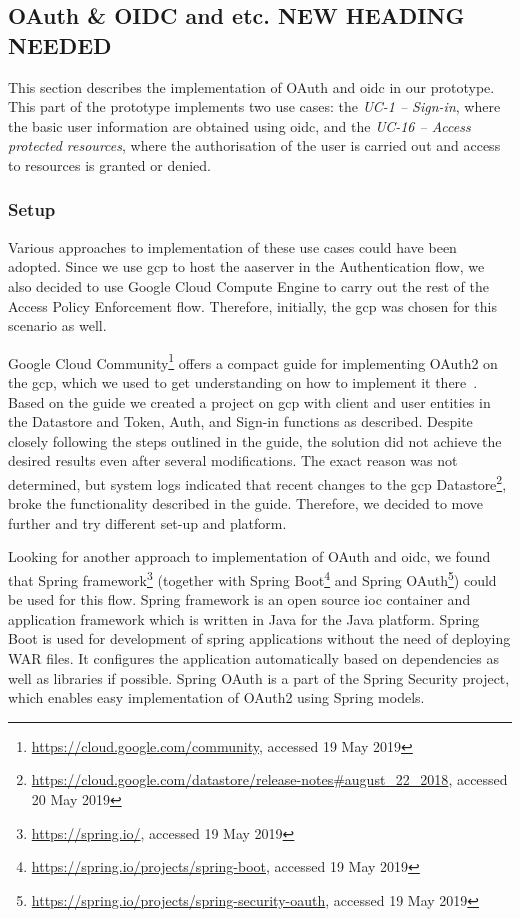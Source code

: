 \subsection{OAuth \& OIDC and etc. NEW HEADING NEEDED} \label{sec:implementation-oauth}

This section describes the implementation of OAuth and \acrshort{oidc} in our prototype. This part of the prototype implements two use cases: the \textit{UC-1 -- Sign-in}, where the basic user information are obtained using \acrshort{oidc}, and the \textit{UC-16 -- Access protected resources}, where the authorisation of the user is carried out and access to resources is granted or denied.

\subsubsection{Setup}
Various approaches to implementation of these use cases could have been adopted. Since we use \acrfull{gcp} to host the \acrshort{aaserver} in the Authentication flow, we also decided to use Google Cloud Compute Engine to carry out the rest of the Access Policy Enforcement flow. Therefore, initially, the \acrlong{gcp} was chosen for this scenario as well.

Google Cloud Community\footnote{\url{https://cloud.google.com/community}, accessed 19 May 2019} offers a compact guide for implementing OAuth2 on the \acrshort{gcp}, which we used to get understanding on how to implement it there~\cite{Awyu2018UnderstandingCloud}. Based on the guide we created a project on \acrshort{gcp} with client and user entities in the Datastore and Token, Auth, and Sign-in functions as described. Despite closely following the steps outlined in the guide, the solution did not achieve the desired results even after several modifications. The exact reason was not determined, but system logs indicated that recent changes to the \acrshort{gcp} Datastore\footnote{\url{https://cloud.google.com/datastore/release-notes\#august_22_2018}, accessed 20 May 2019}, broke the functionality described in the guide.
Therefore, we decided to move further and try different set-up and platform.

Looking for another approach to implementation of OAuth and \acrshort{oidc}, we found that Spring framework\footnote{\url{https://spring.io/}, accessed 19 May 2019} (together with Spring Boot\footnote{\url{https://spring.io/projects/spring-boot}, accessed 19 May 2019} and Spring OAuth\footnote{\url{https://spring.io/projects/spring-security-oauth}, accessed 19 May 2019}) could be used for this flow. Spring framework is an open source \acrshort{ioc} container and application framework which is written in Java for the Java platform. Spring Boot is used for development of spring applications without the need of deploying WAR files. It configures the application automatically based on dependencies as well as libraries if possible. Spring OAuth is a part of the Spring Security project, which enables easy implementation of OAuth2 using Spring models.

